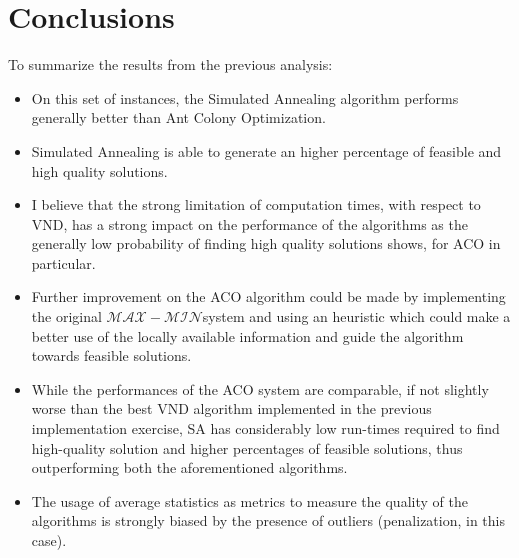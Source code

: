\documentclass{article}
\newcommand{\maxmin}{$\mathcal{MAX}-\mathcal{MIN}$}
\begin{document}








\section{Conclusions}
To summarize the results from the previous analysis:
\begin{itemize}
      \item On this set of instances, the Simulated Annealing algorithm performs generally better than Ant Colony Optimization.
    \item Simulated Annealing is able to generate an higher percentage of feasible and high quality solutions. 
  \item I believe that the strong limitation of computation times, with respect to VND, has a strong impact on the performance of the algorithms as the generally low probability of finding high quality solutions shows, for ACO in particular.
  \item Further improvement on the ACO algorithm could be made by implementing the original \maxmin system and using an heuristic which could make a better use of the locally available information and guide the algorithm towards feasible solutions.
  \item While the performances of the ACO system are comparable, if not slightly worse than the best VND algorithm implemented in the previous implementation exercise, SA has considerably low run-times required to find high-quality solution and higher percentages of feasible solutions, thus outperforming both the aforementioned algorithms.
  \item The usage of average statistics as metrics to measure the quality of the algorithms is strongly biased by the presence of outliers (penalization, in this case).
\end{itemize}





\end{document}
